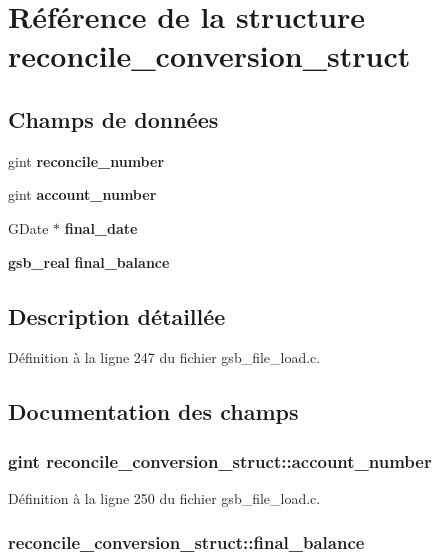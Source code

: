 \section{Référence de la structure reconcile\_\-conversion\_\-struct}
\label{structreconcile__conversion__struct}
\subsection*{Champs de données}
\begin{DoxyCompactItemize}
\item 
gint {\bf reconcile\_\-number}
\item 
gint {\bf account\_\-number}
\item 
GDate $\ast$ {\bf final\_\-date}
\item 
{\bf gsb\_\-real} {\bf final\_\-balance}
\end{DoxyCompactItemize}


\subsection{Description détaillée}


Définition à la ligne 247 du fichier gsb\_\-file\_\-load.c.



\subsection{Documentation des champs}
\subsubsection[{account\_\-number}]{\setlength{\rightskip}{0pt plus 5cm}gint {\bf reconcile\_\-conversion\_\-struct::account\_\-number}}\label{structreconcile__conversion__struct_a916e75629516f6992ca21791ebbac554}


Définition à la ligne 250 du fichier gsb\_\-file\_\-load.c.

\subsubsection[{final\_\-balance}]{ {\bf reconcile\_\-conversion\_\-struct::final\_\-balance}}\label{structreconcile__conversion__struct_a285a14988bc04d387d4c03e0c1957c77}



